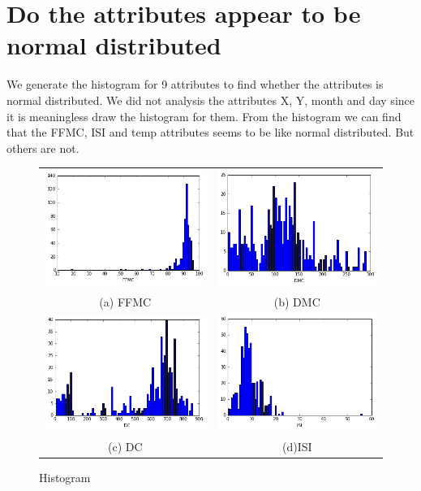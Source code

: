 \section*{Do the attributes appear to be normal distributed}
We generate the histogram for 9 attributes to find whether the attributes is normal distributed. We did not analysis the attributes X, Y, month and day since it is meaningless draw the histogram for them. From the histogram we can find that the FFMC, ISI and temp attributes seems to be like normal distributed. But others are not. 

\begin{figure}
\begin{tabular}{cc}
  \includegraphics[width=65mm]{images/hist/FFMC.png} &   \includegraphics[width=65mm]{images/hist/DMC.png} \\
(a) FFMC & (b) DMC \\[6pt]
 \includegraphics[width=65mm]{images/hist/DC.png} &   \includegraphics[width=65mm]{images/hist/ISI.png} \\
(c) DC & (d)ISI \\[6pt]

\end{tabular}
\caption{Histogram}
\end{figure}


